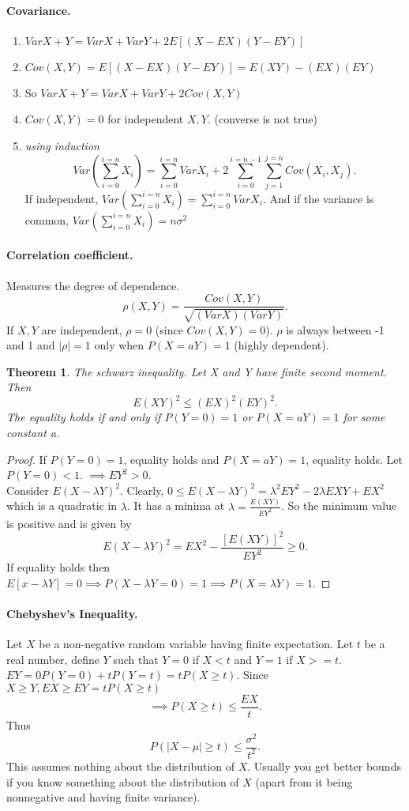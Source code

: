\documentclass{article}
\newtheorem{theorem}{Theorem}
\begin{document}
	\paragraph{Covariance.}
	\begin{enumerate}
		\item $Var X + Y = Var X + Var Y + 2E[(X-EX)(Y-EY)]$
		\item $Cov(X,Y) = E[(X-EX)(Y-EY)] = E(XY) - (EX)(EY)$
		\item So $Var X + Y = Var X + Var Y + 2Cov(X,Y)$
		\item $Cov(X,Y) = 0$ for independent $X,Y$. (converse is not true)
		\item \emph{using induction} \[Var(\sum_{i = 0}^{i = n}X_i) = \sum_{i = 0}^{i = n}Var X_i + 2\sum_{i=0}^{i=n-1}\sum_{j=1}^{j=n}Cov(X_i, X_j).\] 
		If independent, $Var(\sum_{i = 0}^{i = n}X_i) = \sum_{i = 0}^{i = n}Var X_i$. And if the variance is common, $Var(\sum_{i = 0}^{i = n}X_i) = n\sigma^2$
	\end{enumerate}
	\paragraph{Correlation coefficient.} Measures the degree of dependence. \[\rho(X,Y) = \frac{Cov(X,Y)}{\sqrt{(VarX)(Var Y)}}.\]
	If $X,Y$ are independent, $\rho = 0$ (since $Cov(X,Y) = 0$). $\rho$ is always between -1 and 1 and $|\rho|=1$ only when $P(X=aY)=1$ (highly dependent).
	
	\begin{theorem}
		The schwarz inequality. Let X and Y have finite second moment. Then \[E(XY)^2 \leq (EX)^2(EY)^2.\] The equality holds if and only if $P(Y=0)=1$ or 
		$P(X=aY)=1$ for some constant a.
	\end{theorem}
	\begin{proof}
		If $P(Y=0)=1$, equality holds and $P(X=aY)=1$, equality holds. Let $P(Y=0) < 1$. $\implies EY^2 > 0$.\\
		Consider $E(X-\lambda Y)^2$. Clearly, $0 \leq E(X-\lambda Y)^2 = \lambda^2 EY^2 - 2\lambda EXY + EX^2$ which is a quadratic in $\lambda$. It has a minima
		at $\lambda = \frac{E(XY)}{EY^2}$. So the minimum value is positive and is given by \[E(X-\lambda Y)^2 = EX^2 - \frac{[E(XY)]^2}{EY^2} \geq 0.\] If equality holds
		then $E[x-\lambda Y] = 0 \implies P(X-\lambda Y = 0) = 1 \implies P(X = \lambda Y) = 1.$ 
	\end{proof}

	\paragraph{Chebyshev's Inequality.} Let $X$ be a non-negative random variable having finite expectation. Let $t$ be a real number, define $Y$ such that $Y=0$ if 
	$X<t$ and $Y = 1$ if $X >= t$. $EY = 0P(Y=0) + tP(Y=t) = tP(X \geq t)$. Since $X \geq Y, EX \geq EY = tP(X\geq t)$ \[\implies P(X \geq t) \leq \frac{EX}{t}.\]
	Thus \[P(|X-\mu| \geq t) \leq \frac{\sigma^2}{t^2}. \] This assumes nothing about the distribution of $X$. Usually you get better bounds if you know something 
	about the distribution of $X$ (apart from it being nonnegative and having finite variance).
\end{document}

